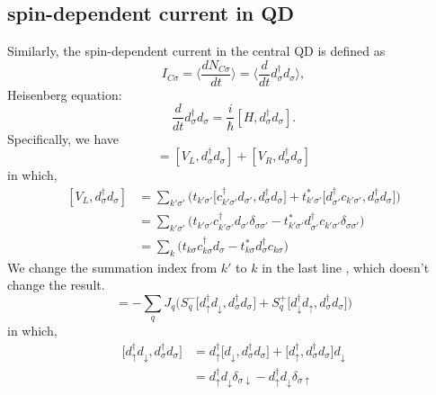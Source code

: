 \documentclass[11pt,a4paper]{article}
\begin{document}
\subsection{spin-dependent current in QD}
Similarly, the spin-dependent current in the central QD is defined as
\begin{equation}
I_{C\sigma} = \langle\frac{dN_{C\sigma}}{dt} \rangle= \langle  \frac{d}{dt} d_{\sigma}^{\dag}d_{\sigma}\rangle,
\end{equation}
Heisenberg equation:
\begin{equation}
\frac{d}{dt} d_{\sigma}^{\dag}d_{\sigma} = \frac{i}{\hbar} [H, d_{\sigma}^{\dag}d_{\sigma}].
\end{equation}
Specifically, we have
\begin{equation}
 [H, d_{\sigma}^{\dag}d_{\sigma}] = [V_{L},  d_{\sigma}^{\dag}d_{\sigma}] + [V_{R},  d_{\sigma}^{\dag}d_{\sigma}]
\end{equation}
in which,
\begin{equation}
\begin{split}
[V_{L},  d_{\sigma}^{\dag}d_{\sigma}] &= \sum_{k'\sigma'}\big(t_{k'\sigma'} \big[c_{k'\sigma'}^{\dag}d_{\sigma'},  d_{\sigma}^{\dag}d_{\sigma}\big] + t_{k'\sigma'}^{*} \big[d_{\sigma'}^{\dag}c_{k'\sigma'},  d_{\sigma}^{\dag}d_{\sigma}\big] \big) \\
&  = \sum_{k'\sigma'}\big(t_{k'\sigma'} c_{k'\sigma'}^{\dag}d_{\sigma'}\delta_{\sigma\sigma'} - t_{k'\sigma'}^{*} d_{\sigma'}^{\dag}c_{k'\sigma'} \delta_{\sigma\sigma'}\big) \\
&= \sum_{k}\big(t_{k\sigma} c_{k\sigma}^{\dag}d_{\sigma} - t_{k\sigma}^{*} d_{\sigma}^{\dag}c_{k\sigma} \big)
\end{split}
\end{equation}
We change the summation index from $k'$ to $k$ in the last line , which doesn't change the result.
\begin{equation}
[V_{R},  d_{\sigma}^{\dag}d_{\sigma}] = -\sum_{q}J_{q}\big( S_{q}^{-} \big[d_{\uparrow}^{\dag}d_{\downarrow}, d_{\sigma}^{\dag}d_{\sigma} \big] + S_{q}^{+}\big[d_{\downarrow}^{\dag}d_{\uparrow}, d_{\sigma}^{\dag}d_{\sigma} \big]\big)
\end{equation}
in which,
\begin{equation}
\begin{split}
\big[d_{\uparrow}^{\dag}d_{\downarrow}, d_{\sigma}^{\dag}d_{\sigma} \big] &= d_{\uparrow}^{\dag} \big[d_{\downarrow}, d_{\sigma}^{\dag}d_{\sigma}\big] + \big[d_{\uparrow}^{\dag} , d_{\sigma}^{\dag}d_{\sigma} \big]d_{\downarrow} \\
&=d_{\uparrow}^{\dag}d_{\downarrow}\delta_{\sigma \downarrow} - d_{\uparrow}^{\dag}d_{\downarrow}\delta_{\sigma \uparrow}
\end{split}
\end{equation}
\end{document}
